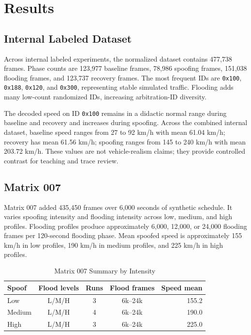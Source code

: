 \documentclass[conference]{IEEEtran}
\begin{document}
\section{Results}
\subsection{Internal Labeled Dataset}
Across internal labeled experiments, the normalized dataset contains 477,738 frames. Phase counts are 123,977 baseline frames, 78,986 spoofing frames, 151,038 flooding frames, and 123,737 recovery frames. The most frequent IDs are \texttt{0x100}, \texttt{0x188}, \texttt{0x120}, and \texttt{0x300}, representing stable simulated traffic. Flooding adds many low-count randomized IDs, increasing arbitration-ID diversity.

The decoded speed on ID \texttt{0x100} remains in a didactic normal range during baseline and recovery and increases during spoofing. Across the combined internal dataset, baseline speed ranges from 27 to 92 km/h with mean 61.04 km/h; recovery has mean 61.56 km/h; spoofing ranges from 145 to 240 km/h with mean 203.72 km/h. These values are not vehicle-realism claims; they provide controlled contrast for teaching and trace review.

\subsection{Matrix 007}
Matrix 007 added 435,450 frames over 6,000 seconds of synthetic schedule. It varies spoofing intensity and flooding intensity across low, medium, and high profiles. Flooding profiles produce approximately 6,000, 12,000, or 24,000 flooding frames per 120-second flooding phase. Mean spoofed speed is approximately 155 km/h in low profiles, 190 km/h in medium profiles, and 225 km/h in high profiles.

\begin{table}[t]
\caption{Matrix 007 Summary by Intensity}
\label{tab:matrix}
\centering
\footnotesize
\begin{tabular}{lcccr}
\toprule
Spoof & Flood levels & Runs & Flood frames & Speed mean \\
\midrule
Low & L/M/H & 3 & 6k--24k & 155.2 \\
Medium & L/M/H & 4 & 6k--24k & 190.0 \\
High & L/M/H & 3 & 6k--24k & 225.0 \\
\bottomrule
\end{tabular}
\end{table}
\end{document}

